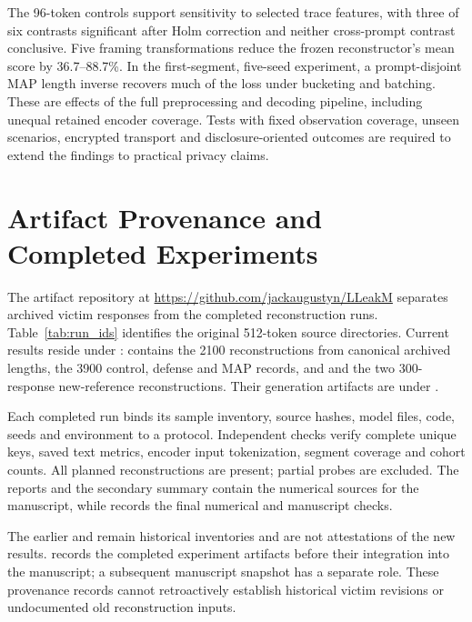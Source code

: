 \documentclass[electronics,article,submit,pdftex,moreauthors]{Definitions/mdpi}
\begin{document}
The 96-token controls support sensitivity to selected trace features, with three of six contrasts significant after Holm correction and neither cross-prompt contrast conclusive. Five framing transformations reduce the frozen reconstructor's mean score by 36.7--88.7\%. In the first-segment, five-seed experiment, a prompt-disjoint MAP length inverse recovers much of the loss under bucketing and batching. These are effects of the full preprocessing and decoding pipeline, including unequal retained encoder coverage. Tests with fixed observation coverage, unseen scenarios, encrypted transport and disclosure-oriented outcomes are required to extend the findings to practical privacy claims.

\appendixstart
\appendix
\section{Artifact Provenance and Completed Experiments}\label{app:runs}
The artifact repository at \url{https://github.com/jackaugustyn/LLeakM} separates archived victim responses from the completed reconstruction runs. Table~\ref{tab:run_ids} identifies the original 512-token source directories. Current results reside under :  contains the 2100 reconstructions from canonical archived lengths,  the 3900 control, defense and MAP records, and  and  the two 300-response new-reference reconstructions. Their generation artifacts are under .

Each completed run binds its sample inventory, source hashes, model files, code, seeds and environment to a protocol. Independent checks verify complete unique keys, saved text metrics, encoder input tokenization, segment coverage and cohort counts. All planned reconstructions are present; partial probes are excluded. The  reports and the secondary summary contain the numerical sources for the manuscript, while  records the final numerical and manuscript checks.

The earlier  and  remain historical inventories and are not attestations of the new results.  records the completed experiment artifacts before their integration into the manuscript; a subsequent manuscript snapshot has a separate role. These provenance records cannot retroactively establish historical victim revisions or undocumented old reconstruction inputs.
\end{document}

